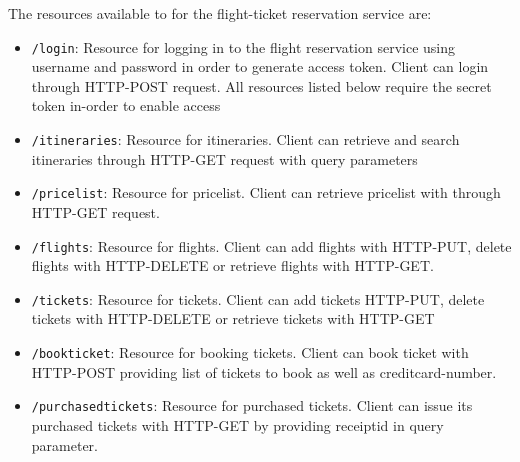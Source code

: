 \documentclass[a4paper, 11pt]{article}
\begin{document}
The resources available to for the flight-ticket reservation service are:
\begin{itemize}
\item \texttt{/login}: Resource for logging in to the flight reservation service using username and password in order to generate access token. Client can login through HTTP-POST request. All resources listed below require the secret token in-order to enable access
\item \texttt{/itineraries}: Resource for itineraries. Client can retrieve and search itineraries through HTTP-GET request with query parameters
\item \texttt{/pricelist}: Resource for pricelist. Client can retrieve pricelist with through HTTP-GET request.
\item \texttt{/flights}: Resource for flights. Client can add flights with HTTP-PUT, delete flights with HTTP-DELETE or retrieve flights with HTTP-GET.
\item \texttt{/tickets}: Resource for tickets. Client can add tickets HTTP-PUT, delete tickets with HTTP-DELETE or retrieve tickets with HTTP-GET
\item \texttt{/bookticket}: Resource for booking tickets. Client can book ticket with HTTP-POST providing list of tickets to book as well as creditcard-number.
\item \texttt{/purchasedtickets}: Resource for purchased tickets. Client can issue its purchased tickets with HTTP-GET by providing receiptid in query parameter.
\end{itemize}
\end{document}
